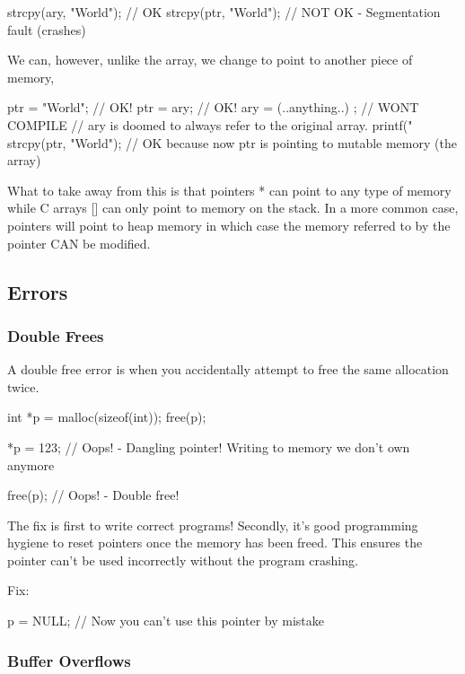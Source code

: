 \begin{code}[language=C]
strcpy(ary, "World"); // OK
strcpy(ptr, "World"); // NOT OK - Segmentation fault (crashes)
\end{code}

We can, however, unlike the array, we change  to point to
another piece of memory,

\begin{code}[language=C]
ptr = "World"; // OK!
ptr = ary; // OK!
ary = (..anything..) ; // WONT COMPILE
// ary is doomed to always refer to the original array.
printf("%
strcpy(ptr, "World"); // OK because now ptr is pointing to mutable memory (the array)
\end{code}

What to take away from this is that pointers * can point to any type of memory while C arrays {[}{]} can only point to memory on the stack. In a more common case, pointers will point to heap memory in which case the memory referred to by the pointer CAN be modified.

\subsection{Errors}

\subsubsection{Double Frees}

A double free error is when you accidentally attempt to free the same allocation twice.

\begin{code}[language=C]
int *p = malloc(sizeof(int));
free(p);

*p = 123; // Oops! - Dangling pointer! Writing to memory we don't own anymore

free(p); // Oops! - Double free!
\end{code}

The fix is first to write correct programs! Secondly, it's good programming hygiene to reset pointers once the memory has been freed. This ensures the pointer can't be used incorrectly without the program crashing.

Fix:

\begin{code}[language=C]
p = NULL; // Now you can't use this pointer by mistake
\end{code}

\subsubsection{Buffer Overflows}

